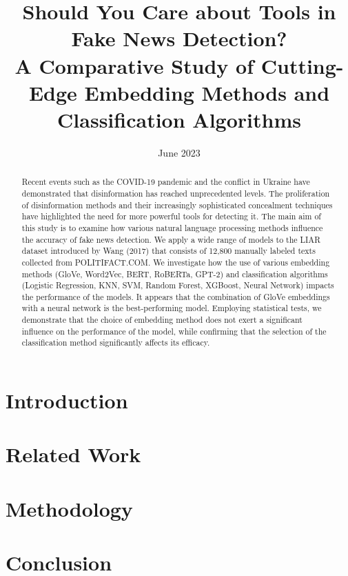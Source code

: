 \documentclass[magisterska,en]{mgr}
\title{Should You Care about Tools in Fake News Detection? \\ A Comparative Study of Cutting-Edge Embedding Methods and Classification Algorithms}
\date{June 2023}
\begin{document}
\maketitle

\begin{abstract}
    Recent events such as the COVID-19 pandemic and the conflict in Ukraine have demonstrated that disinformation has reached unprecedented levels. The proliferation of disinformation methods and their increasingly sophisticated concealment techniques have highlighted the need for more powerful tools for detecting it. 
    The main aim of this study is to examine how various natural language processing methods influence the accuracy of fake news detection. We apply a wide range of models to the LIAR dataset introduced by Wang (2017) that consists of 12,800 manually labeled texts collected from POLITIFACT.COM. We investigate how the use of various embedding methods (GloVe, Word2Vec, BERT, RoBERTa, GPT-2) and classification algorithms (Logistic Regression, KNN, SVM, Random Forest, XGBoost, Neural Network) impacts the performance of the models. It appears that the combination of GloVe embeddings with a neural network is the best-performing model. Employing statistical tests, we demonstrate that the choice of embedding method does not exert a significant influence on the performance of the model, while confirming that the selection of the classification method significantly affects its efficacy.
\end{abstract}

\tableofcontents


\chapter*{Introduction}


\chapter{Related Work}\label{r:related_work}


\chapter{Methodology}\label{r:methodology}


\chapter{Conclusion}\label{r:conclusion}

\end{document}
